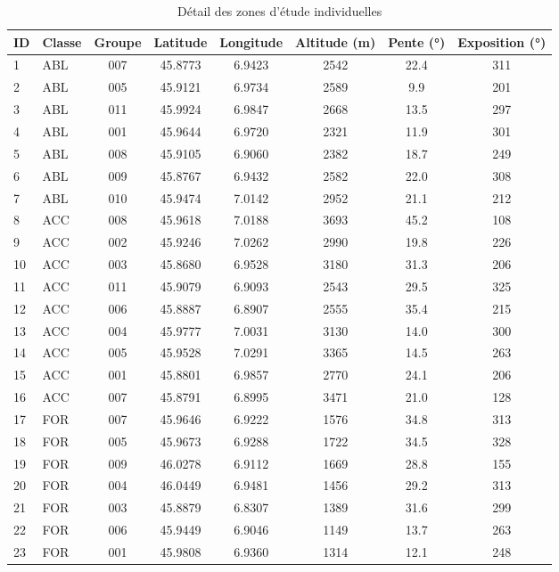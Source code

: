 
\begin{table}[htbp]
\centering
\caption{Détail des zones d'étude individuelles}
\label{tab:detailed_study_areas}
\begin{tabular}{|l|l|c|c|c|c|c|c|}
\hline
\textbf{ID} & \textbf{Classe} & \textbf{Groupe} & \textbf{Latitude} & \textbf{Longitude} & \textbf{Altitude (m)} & \textbf{Pente (°)} & \textbf{Exposition (°)} \\
\hline
1 & ABL & 007 & 45.8773 & 6.9423 & 2542 & 22.4 & 311 \\
2 & ABL & 005 & 45.9121 & 6.9734 & 2589 & 9.9 & 201 \\
3 & ABL & 011 & 45.9924 & 6.9847 & 2668 & 13.5 & 297 \\
4 & ABL & 001 & 45.9644 & 6.9720 & 2321 & 11.9 & 301 \\
5 & ABL & 008 & 45.9105 & 6.9060 & 2382 & 18.7 & 249 \\
6 & ABL & 009 & 45.8767 & 6.9432 & 2582 & 22.0 & 308 \\
7 & ABL & 010 & 45.9474 & 7.0142 & 2952 & 21.1 & 212 \\
8 & ACC & 008 & 45.9618 & 7.0188 & 3693 & 45.2 & 108 \\
9 & ACC & 002 & 45.9246 & 7.0262 & 2990 & 19.8 & 226 \\
10 & ACC & 003 & 45.8680 & 6.9528 & 3180 & 31.3 & 206 \\
11 & ACC & 011 & 45.9079 & 6.9093 & 2543 & 29.5 & 325 \\
12 & ACC & 006 & 45.8887 & 6.8907 & 2555 & 35.4 & 215 \\
13 & ACC & 004 & 45.9777 & 7.0031 & 3130 & 14.0 & 300 \\
14 & ACC & 005 & 45.9528 & 7.0291 & 3365 & 14.5 & 263 \\
15 & ACC & 001 & 45.8801 & 6.9857 & 2770 & 24.1 & 206 \\
16 & ACC & 007 & 45.8791 & 6.8995 & 3471 & 21.0 & 128 \\
17 & FOR & 007 & 45.9646 & 6.9222 & 1576 & 34.8 & 313 \\
18 & FOR & 005 & 45.9673 & 6.9288 & 1722 & 34.5 & 328 \\
19 & FOR & 009 & 46.0278 & 6.9112 & 1669 & 28.8 & 155 \\
20 & FOR & 004 & 46.0449 & 6.9481 & 1456 & 29.2 & 313 \\
21 & FOR & 003 & 45.8879 & 6.8307 & 1389 & 31.6 & 299 \\
22 & FOR & 006 & 45.9449 & 6.9046 & 1149 & 13.7 & 263 \\
23 & FOR & 001 & 45.9808 & 6.9360 & 1314 & 12.1 & 248 \\

\end{tabular}
\end{table}
